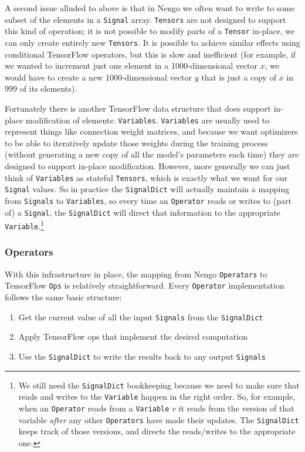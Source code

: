 \documentclass{article}
\begin{document}
A second issue alluded to above is that in Nengo we often want to write to some subset of the elements in a \texttt{Signal} array.  \texttt{Tensors} are not designed to support this kind of operation; it is not possible to modify parts of a \texttt{Tensor} in-place, we can only create entirely new \texttt{Tensors}.  It is possible to achieve similar effects using conditional TensorFlow operators, but this is slow and inefficient (for example, if we wanted to increment just one element in a 1000-dimensional vector $x$, we would have to create a new 1000-dimensional vector $y$ that is just a copy of $x$ in 999 of its elements).

Fortunately there is another TensorFlow data structure that does support in-place modification of elements: \texttt{Variables}.  \texttt{Variables} are usually used to represent things like connection weight matrices, and because we want optimizers to be able to iteratively update those weights during the training process (without generating a new copy of all the model's parameters each time) they are designed to support in-place modification.  However, more generally we can just think of \texttt{Variables} as stateful \texttt{Tensors}, which is exactly what we want for our \texttt{Signal} values.  So in practice the \texttt{SignalDict} will actually maintain a mapping from \texttt{Signals} to \texttt{Variables}, so every time an \texttt{Operator} reads or writes to (part of) a \texttt{Signal}, the \texttt{SignalDict} will direct that information to the appropriate \texttt{Variable}.\footnote{We still need the \texttt{SignalDict} bookkeeping because we need to make sure that reads and writes to the \texttt{Variable} happen in the right order.  So, for example, when an \texttt{Operator} reads from a \texttt{Variable} $v$ it reads from the version of that variable \emph{after} any other \texttt{Operators} have made their updates.  The \texttt{SignalDict} keeps track of those versions, and directs the reads/writes to the appropriate one.}

\subsubsection{Operators}

With this infrastructure in place, the mapping from Nengo \texttt{Operators} to TensorFlow \texttt{Ops} is relatively straightforward.  Every \texttt{Operator} implementation follows the same basic structure:

\begin{enumerate}
\item Get the current value of all the input \texttt{Signals} from the \texttt{SignalDict}
\item Apply TensorFlow ops that implement the desired computation
\item Use the \texttt{SignalDict} to write the results back to any output \texttt{Signals}
\end{enumerate}
\end{document}

